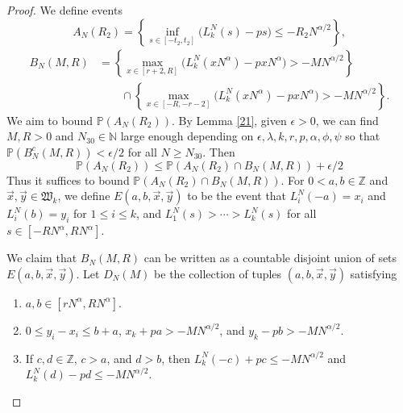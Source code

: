 	\begin{proof}
		We define events
		\[
		A_N(R_2) = \left\{\inf_{s \in [ -t_2, t_2 ]}\big(L^N_k(s) - p s \big) \leq - R_2N^{\alpha/2}\right\},
		\]
		\begin{align*}
		B_N(M,R) &= \left\{ \max_{x\in [r+2, R]} \big(L^N_k(xN^\alpha) - pxN^\alpha\big) > -MN^{\alpha/2} \right\}\\
		&\qquad \cap \left\{ \max_{x\in [-R, -r-2]} \big(L^N_k(xN^\alpha) - pxN^\alpha\big) > -MN^{\alpha/2} \right\}.
		\end{align*}
		We aim to bound $\mathbb{P}(A_N(R_2))$. By Lemma \ref{21}, given $\epsilon > 0$, we can find $M,R>0$ and $N_{30}\in\mathbb{N}$ large enough depending on $\epsilon,\lambda,k,r,p,\alpha,\phi,\psi$ so that $\mathbb{P}(B_N^c(M,R)) < \epsilon/2$ for all $N\geq N_{30}$. Then
		\begin{equation}
		\mathbb{P}(A_N(R_2)) \leq \mathbb{P}(A_N(R_2)\cap B_N(M,R)) + \epsilon/2 \label{4.3cases}
		\end{equation}
		Thus it suffices to bound $\mathbb{P}(A_N(R_2)\cap B_N(M,R))$. For $0<a,b\in\mathbb{Z}$ and $\vec{x},\vec{y}\in\mathfrak{W}_k$, we define $E(a,b,\vec{x},\vec{y})$ to be the event that $L_i^N(-a) = x_i$ and $L_i^N(b) = y_i$ for $1\leq i\leq k$, and $L_1^N(s) > \cdots > L_k^N(s)$ for all $s\in[-RN^\alpha,RN^\alpha]$.
		
		We claim that $B_N(M,R)$ can be written as a countable disjoint union of sets $E(a,b,\vec{x},\vec{y})$. Let $D_N(M)$ be the collection of tuples $(a,b,\vec{x},\vec{y})$ satisfying 
		\begin{enumerate}[label=(\arabic*)]
			
			\item $a,b\in[rN^\alpha,RN^\alpha]$.
			
			\item $0 \leq y_i - x_i \leq b+a$, $x_k + pa > - MN^{\alpha/2}$, and $y_k - pb > - MN^{\alpha/2}$.
			
			\item If $c,d\in\mathbb{Z}$, $c > a$, and $d>b$, then $L_k^N(-c) + pc \leq -MN^{\alpha/2}$ and $L_k^N(d) - pd \leq -MN^{\alpha/2}$.
			

\end{enumerate}
\end{proof}
